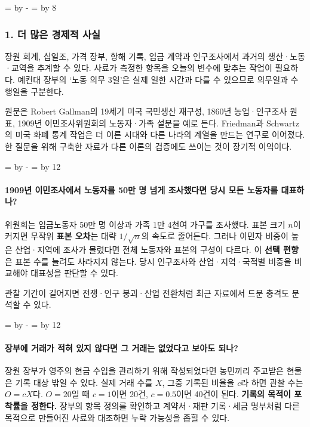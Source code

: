\documentclass[10pt,a4paper]{article}
\newcommand{\ReserveQuestionSpace}{%
  \par\begingroup
  \dimen0=\pagegoal \advance\dimen0 by -\pagetotal
  \dimen2=\baselineskip \multiply\dimen2 by 12
  \ifdim\dimen0<\dimen2 \newpage\fi
  \endgroup}
\newcommand{\ReserveReadingSectionSpace}{%
  \par\begingroup
  \dimen0=\pagegoal \advance\dimen0 by -\pagetotal
  \dimen2=\baselineskip \multiply\dimen2 by 8
  \ifdim\dimen0<\dimen2 \newpage\fi
  \endgroup}
\begin{document}
\ReserveReadingSectionSpace
\subsubsection*{1. 더 많은 경제적 사실}

장원 회계, 십일조, 가격 장부, 항해 기록, 임금 계약과 인구조사에서 과거의 생산·노동·교역을 추계할 수 있다. 사료가 측정한 항목을 오늘의 변수에 맞추는 작업이 필요하다. 예컨대 장부의 ‘노동 의무 3일’은 실제 일한 시간과 다를 수 있으므로 의무일과 수행일을 구분한다.\par

원문은 Robert Gallman의 19세기 미국 국민생산 재구성, 1860년 농업·인구조사 원표, 1909년 이민조사위원회의 노동자·가족 설문을 예로 든다. Friedman과 Schwartz의 미국 화폐 통계 작업은 더 이른 시대와 다른 나라의 계열을 만드는 연구로 이어졌다. 한 질문을 위해 구축한 자료가 다른 이론의 검증에도 쓰이는 것이 장기적 이익이다.\par

\ReserveQuestionSpace
\paragraph{1909년 이민조사에서 노동자를 50만 명 넘게 조사했다면 당시 모든 노동자를 대표하나?}
위원회는 임금노동자 50만 명 이상과 가족 1만 4천여 가구를 조사했다. 표본 크기 $n$이 커지면 무작위 \textbf{표본 오차}는 대략 $1/\sqrt{n}$의 속도로 줄어든다. 그러나 이민자 비중이 높은 산업·지역에 조사가 몰렸다면 전체 노동자와 표본의 구성이 다르다. 이 \textbf{선택 편향}은 표본 수를 늘려도 사라지지 않는다. 당시 인구조사와 산업·지역·국적별 비중을 비교해야 대표성을 판단할 수 있다.\par

관찰 기간이 길어지면 전쟁·인구 붕괴·산업 전환처럼 최근 자료에서 드문 충격도 분석할 수 있다.\par

\ReserveQuestionSpace
\paragraph{장부에 거래가 적혀 있지 않다면 그 거래는 없었다고 보아도 되나?}
장원 장부가 영주의 현금 수입을 관리하기 위해 작성되었다면 농민끼리 주고받은 현물은 기록 대상 밖일 수 있다. 실제 거래 수를 $X$, 그중 기록된 비율을 $c$라 하면 관찰 수는 $O=cX$다. $O=20$일 때 $c=1$이면 20건, $c=0.5$이면 40건이 된다. \textbf{기록의 목적이 포착률을 정한다.} 장부의 항목 정의를 확인하고 계약서·재판 기록·세금 명부처럼 다른 목적으로 만들어진 사료와 대조하면 누락 가능성을 좁힐 수 있다.\par
\end{document}
